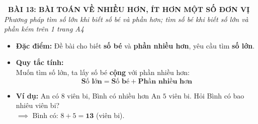 \documentclass[11pt,a4paper]{article}
\begin{document}
\begin{tcolorbox}[
  enhanced,
  colback=violet!8!white,
  colframe=violet!70!black,
  arc=3mm, boxrule=1.2pt,
  left=3mm, right=3mm, top=2mm, bottom=2mm,
  halign=center
]
  {\LARGE\bfseries\color{violet!90!black}\faBookmark\ BÀI 13: BÀI TOÁN VỀ NHIỀU HƠN, ÍT HƠN MỘT SỐ ĐƠN VỊ}\\[1mm]
  {\itshape\footnotesize\color{black!75} Phương pháp tìm số lớn khi biết số bé và phần hơn; tìm số bé khi biết số lớn và phần kém trên 1 trang A4}
\end{tcolorbox}

\vspace{-2mm}

\noindent
\begin{minipage}[t]{0.49\textwidth}\vspace{0pt}
\begin{tcolorbox}[
  enhanced,
  colback=violet!4!white,
  colframe=violet!75!black,
  arc=2mm, boxrule=0.8pt,
  left=2mm, right=2mm, top=1.8mm, bottom=1.8mm,
  title={\footnotesize\bfseries\color{white}\faKey\ 1. Dạng 1: Bài toán về nhiều hơn}
]
{\footnotesize
\begin{itemize}\setlength{\itemsep}{1pt}\setlength{\leftskip}{-2.5mm}
  \item \textbf{Đặc điểm:} Đề bài cho biết \textbf{số bé} và \textbf{phần nhiều hơn}, yêu cầu tìm \textbf{số lớn}.
  \item \textbf{Quy tắc tính:}\\
  Muốn tìm số lớn, ta lấy số bé \textbf{cộng} với phần nhiều hơn:
  $$\mathbf{\text{Số lớn} = \text{Số bé} + \text{Phần nhiều hơn}}$$
  \item \textbf{Ví dụ:} An có $8$ viên bi, Bình có nhiều hơn An $5$ viên bi. Hỏi Bình có bao nhiêu viên bi?\\
  $\implies$ Bình có: $8 + 5 = \mathbf{13}$ (viên bi).
\end{itemize}
}
\end{tcolorbox}
\end{minipage}
\hfill
\end{document}
